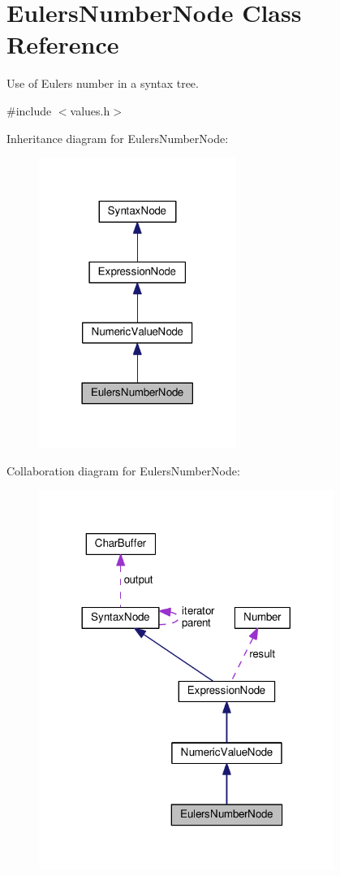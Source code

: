 \hypertarget{classEulersNumberNode}{}\section{Eulers\+Number\+Node Class Reference}
\label{classEulersNumberNode}


Use of Eulers number in a syntax tree.  




{\ttfamily \#include $<$values.\+h$>$}



Inheritance diagram for Eulers\+Number\+Node\+:
\nopagebreak
\begin{figure}[H]
\begin{center}
\leavevmode
\includegraphics[width=182pt]{dc/d16/classEulersNumberNode__inherit__graph}
\end{center}
\end{figure}


Collaboration diagram for Eulers\+Number\+Node\+:
\nopagebreak
\begin{figure}[H]
\begin{center}
\leavevmode
\includegraphics[width=272pt]{d5/dd6/classEulersNumberNode__coll__graph}
\end{center}
\end{figure}
